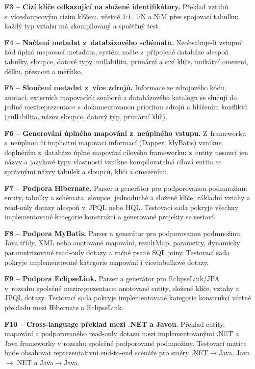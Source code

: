\documentclass{article}
\begin{document}
\textbf{F3 -- Cizí klíče odkazující na složené identifikátory.} Překlad vztahů s~vícesloupcovým cizím klíčem, včetně 1:1, 1:N a N:M přes spojovací tabulku; každý typ vztahu má zkompilovaný a spuštěný test.

\textbf{F4 -- Načtení metadat z~databázového schématu.} Neobsahuje-li vstupní kód úplná mapovací metadata, systém načte z~připojené databáze alespoň tabulky, sloupce, datové typy, nullabilitu, primární a cizí klíče, unikátní omezení, délku, přesnost a měřítko.

\textbf{F5 -- Sloučení metadat z~více zdrojů.} Informace ze zdrojového kódu, anotací, externích mapovacích souborů a databázového katalogu se slučují do jediné mezireprezentace s~dokumentovanou prioritou zdrojů a hlášením konfliktů (nullabilita, název sloupce, datový typ, primární klíč).

\textbf{F6 -- Generování úplného mapování z~neúplného vstupu.} Z~frameworku s~neúplnou či implicitní mapovací informací (Dapper, MyBatis) vznikne doplněním z~databáze úplné mapování cílového frameworku: z~entity nesoucí jen názvy a jazykové typy vlastností vznikne kompilovatelná cílová entita se správnými názvy tabulek a sloupců, klíči a omezeními.

\textbf{F7 -- Podpora Hibernate.} Parser a generátor pro podporovanou podmnožinu: entity, tabulky a schémata, sloupce, jednoduché a složené klíče, základní vztahy a read-only dotazy alespoň v~JPQL nebo HQL. Testovací sada pokryje všechny implementované kategorie konstrukcí a generované projekty se sestaví.

\textbf{F8 -- Podpora MyBatis.} Parser a generátor pro podporovanou podmnožinu: Java třídy, XML nebo anotované mapování, resultMap, parametry, dynamicky parametrizované read-only dotazy a ručně psané SQL joiny. Testovací sada pokryje implementované kategorie mapování i vícetabulkové dotazy.

\textbf{F9 -- Podpora EclipseLink.} Parser a generátor pro EclipseLink/JPA v~rozsahu společné mezireprezentace: anotované entity, složené klíče, vztahy a JPQL dotazy. Testovací sada pokryje implementované kategorie konstrukcí včetně překladu mezi Hibernate a EclipseLink.

\textbf{F10 -- Cross-language překlad mezi .NET a Javou.} Překlad entity, mapování a podporovaného read-only dotazu mezi implementovanými .NET a Java frameworky v rozsahu společné podporované podmnožiny. Testovací matice bude obsahovat reprezentativní end-to-end scénáře pro směry .NET$\to$Java, Java$\to$.NET a Java$\to$Java.
\end{document}

